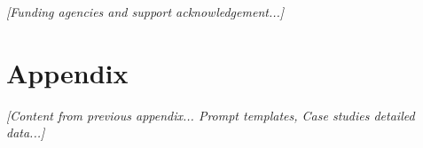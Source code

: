 \documentclass[sigconf,review]{acmart}
\newcommand{\placeholder}[1]{{\color{gray}\textit{[#1]}}}
\begin{document}





\begin{acks}
\placeholder{Funding agencies and support acknowledgement...}
\end{acks}




\appendix
\section{Appendix}
\placeholder{Content from previous appendix... Prompt templates, Case studies detailed data...}
\end{document}
